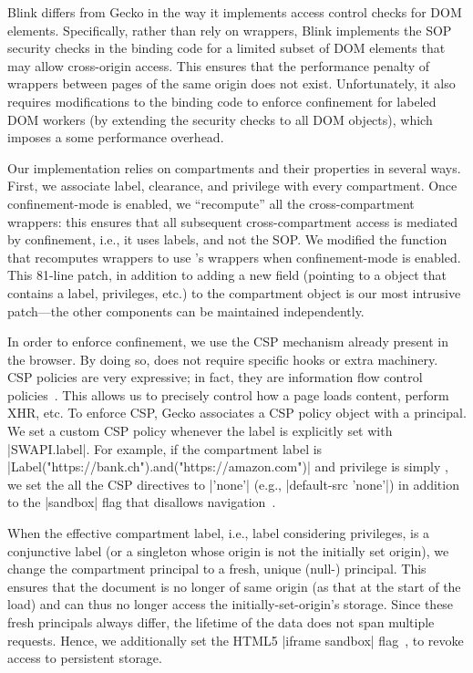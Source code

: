 Blink differs from Gecko in the way it implements access control checks for
DOM elements. 
%
Specifically, rather than rely on wrappers, Blink implements the SOP security
checks in the binding code for a limited subset of DOM elements that may allow
cross-origin access.
%
This ensures that the performance penalty of wrappers between pages of the same
origin does not exist.
%
Unfortunately, it also requires modifications to the binding code to enforce
confinement for labeled DOM workers (by extending the security checks to all
DOM objects), which imposes a some performance overhead.

Our implementation relies on compartments and their properties in
several ways.
%
First, we associate label, clearance, and privilege with every 
compartment.
%
Once confinement-mode is enabled, we ``recompute'' all the
cross-compartment wrappers: this ensures that all subsequent
cross-compartment access is mediated by confinement, i.e., it uses
labels, and not the SOP. %
%
We modified the function that recomputes wrappers to use \sys{}'s
wrappers when confinement-mode is enabled.
%
This 81-line patch, in addition to adding a new field (pointing to a \sys{}
object that contains a label, privileges, etc.) to the compartment
object is our most intrusive patch---the other \sys{} components can be
maintained independently.
 
%
In order to enforce confinement, we use the CSP mechanism already present 
in the browser. 
By doing so, \sys{} does not require specific hooks or extra machinery. 
CSP policies are very expressive; in fact, they are
information flow control policies~\cite{yang:2013:towards}. This allows us
to precisely control how a page loads content, perform XHR, etc.
To enforce CSP, Gecko associates a CSP policy object with a principal.
%
We set a custom CSP policy whenever the label is
explicitly set with \js|SWAPI.label|.
%
For example, if the compartment label is
\js|Label("https://bank.ch").and("https://amazon.com")| and privilege
is simply , we set the all the CSP directives to
\js|'none'| (e.g., \js|default-src 'none'|) in addition to the
\js|sandbox| flag that disallows
navigation~\cite{csp1.1,whatwg-html,html5}.
%

When the effective compartment label, i.e., label considering
privileges, is a conjunctive label (or a singleton whose origin is not
the initially set origin), we change the compartment principal to a
fresh, unique (null-) principal. 
%
This ensures that the document is no longer of same origin (as that
at the start of the load) and can thus no longer access the
initially-set-origin's storage.
%
Since these fresh principals always differ, the lifetime of the data does not
span multiple requests.
%
Hence, we additionally set the HTML5 \js|iframe sandbox| flag~\cite{html5},
to revoke access to persistent storage.


